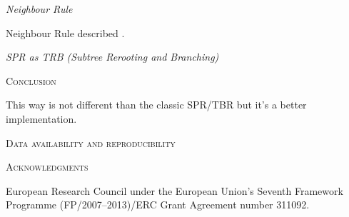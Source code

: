 \documentclass[12pt,letterpaper]{article}
\renewcommand{\section}[1]{%
\bigskip
\begin{center}
\begin{Large}
\normalfont\scshape #1
\medskip
\end{Large}
\end{center}}
\renewcommand{\subsection}[1]{%
\bigskip
\begin{center}
\begin{large}
\normalfont\itshape #1
\end{large}
\end{center}}
\begin{document}
\subsection{Neighbour Rule}
Neighbour Rule described \citep[in other words;][]{allen2001subtree}.

\subsection{SPR as TRB (Subtree Rerooting and Branching)}

\section{Conclusion}

This way is not different than the classic SPR/TBR but it's a better implementation.

\section{Data availability and reproducibility}


\section{Acknowledgments}
European Research Council under the European Union’s Seventh Framework Programme (FP/2007–2013)/ERC Grant Agreement number 311092.




\end{document}
